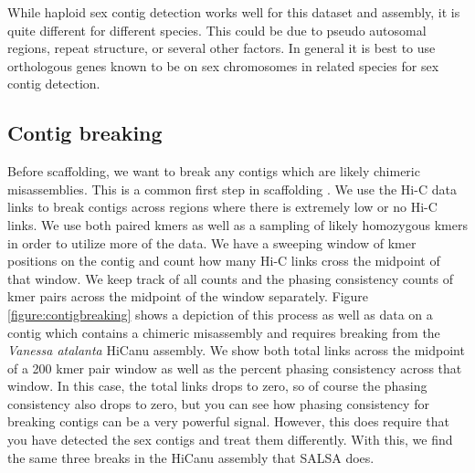 {\par{
While haploid sex contig detection works well for this dataset and assembly, it is quite different for different species. This could be due to pseudo autosomal regions, repeat structure, or several other factors. In general it is best to use orthologous genes known to be on sex chromosomes in related species for sex contig detection.
}

\subsection{Contig breaking}

\par{
Before scaffolding, we want to break any contigs which are likely chimeric misassemblies. This is a common first step in scaffolding \cite{SALSA}\cite{scaffoldingreview}. We use the Hi-C data links to break contigs across regions where there is extremely low or no Hi-C links. We use both paired kmers as well as a sampling of likely homozygous kmers in order to utilize more of the data. We have a sweeping window of kmer positions on the contig and count how many Hi-C links cross the midpoint of that window. We keep track of all counts and the phasing consistency counts of kmer pairs across the midpoint of the window separately. Figure \ref{figure:contigbreaking} shows a depiction of this process as well as data on a contig which contains a chimeric misassembly and requires breaking from the \textit{Vanessa atalanta} HiCanu assembly. We show both total links across the midpoint of a 200 kmer pair window as well as the percent phasing consistency across that window. In this case, the total links drops to zero, so of course the phasing consistency also drops to zero, but you can see how phasing consistency for breaking contigs can be a very powerful signal. However, this does require that you have detected the sex contigs and treat them differently. With this, we find the same three breaks in the HiCanu assembly that SALSA does.
}

}
